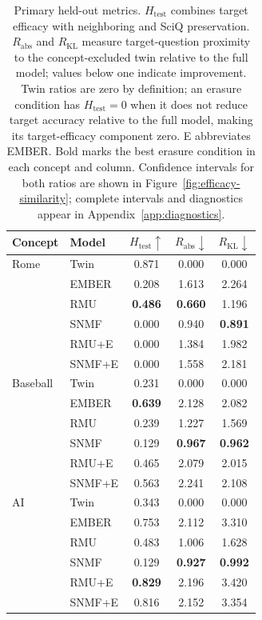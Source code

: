 \begin{table}[t]
  \centering
  \small
  \begin{tabular}{llccc}
    \toprule
    Concept & Model & $H_{\mathrm{test}}\uparrow$
      & $R_{\mathrm{abs}}\downarrow$
      & $R_{\mathrm{KL}}\downarrow$ \\
    \midrule
    Rome & Twin & 0.871 & 0.000 & 0.000 \\
    & EMBER & 0.208 & 1.613 & 2.264 \\
    & RMU & \textbf{0.486} & \textbf{0.660} & 1.196 \\
    & SNMF & 0.000 & 0.940 & \textbf{0.891} \\
    & RMU+E & 0.000 & 1.384 & 1.982 \\
    & SNMF+E & 0.000 & 1.558 & 2.181 \\
    \midrule
    Baseball & Twin & 0.231 & 0.000 & 0.000 \\
    & EMBER & \textbf{0.639} & 2.128 & 2.082 \\
    & RMU & 0.239 & 1.227 & 1.569 \\
    & SNMF & 0.129 & \textbf{0.967} & \textbf{0.962} \\
    & RMU+E & 0.465 & 2.079 & 2.015 \\
    & SNMF+E & 0.563 & 2.241 & 2.108 \\
    \midrule
    AI & Twin & 0.343 & 0.000 & 0.000 \\
    & EMBER & 0.753 & 2.112 & 3.310 \\
    & RMU & 0.483 & 1.006 & 1.628 \\
    & SNMF & 0.129 & \textbf{0.927} & \textbf{0.992} \\
    & RMU+E & \textbf{0.829} & 2.196 & 3.420 \\
    & SNMF+E & 0.816 & 2.152 & 3.354 \\
    \bottomrule
  \end{tabular}
  \caption{Primary held-out metrics. $H_{\mathrm{test}}$ combines target
  efficacy with neighboring and SciQ preservation. $R_{\mathrm{abs}}$ and
  $R_{\mathrm{KL}}$ measure target-question proximity to the concept-excluded
  twin relative to the full model; values below one indicate improvement.
  Twin ratios are zero by definition; an erasure condition has
$H_{\mathrm{test}}=0$ when it does not reduce target accuracy relative to the
full model, making its target-efficacy component zero. E abbreviates EMBER. Bold marks the best
  erasure condition in each concept and column. Confidence intervals for both
  ratios are shown in Figure~\ref{fig:efficacy-similarity}; complete intervals
  and diagnostics appear in Appendix~\ref{app:diagnostics}.}
  \label{tab:target}
\end{table}

